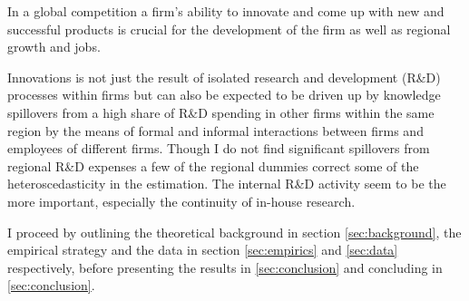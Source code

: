 \label{sec:intro}
In a global competition a firm's ability to innovate and come up with new and successful products is crucial for the development of the firm as well as regional growth and jobs.

Innovations is not just the result of isolated research and development (R\&D) processes within firms but can also be expected to be driven up by knowledge spillovers from a high share of R\&D spending in other firms within the same region by the means of formal and informal interactions between firms and employees of different firms. Though I do not find significant spillovers from regional R\&D expenses a few of the regional dummies correct some of the heteroscedasticity in the estimation. The internal R\&D activity seem to be the more important, especially the continuity of in-house research.

I proceed by outlining the theoretical background in section \ref{sec:background}, the empirical strategy and the data in section \ref{sec:empirics} and \ref{sec:data} respectively, before presenting the results in \ref{sec:conclusion} and concluding in \ref{sec:conclusion}.
